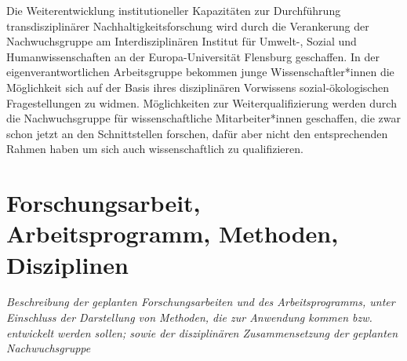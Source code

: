 \documentclass[a4paper,11pt,twoside]{scrartcl}
\begin{document}

Die Weiterentwicklung institutioneller Kapazitäten zur Durchführung transdisziplinärer Nachhaltigkeitsforschung wird durch die Verankerung der Nachwuchsgruppe am Interdisziplinären Institut für Umwelt-, Sozial und Humanwissenschaften an der Europa-Universität Flensburg geschaffen. In der eigenverantwortlichen Arbeitsgruppe bekommen junge Wissenschaftler*innen die Möglichkeit sich auf der Basis ihres disziplinären Vorwissens sozial-ökologischen Fragestellungen zu widmen. Möglichkeiten zur Weiterqualifizierung werden durch die  Nachwuchsgruppe für wissenschaftliche Mitarbeiter*innen geschaffen, die zwar schon jetzt an den Schnittstellen forschen, dafür aber nicht den entsprechenden Rahmen haben um sich auch wissenschaftlich zu qualifizieren.


\section{Forschungsarbeit, Arbeitsprogramm, Methoden, Disziplinen}
\textit{Beschreibung der geplanten Forschungsarbeiten und des Arbeitsprogramms, unter Einschluss der Darstellung von Methoden, die zur Anwendung kommen bzw. entwickelt werden sollen; sowie der disziplinären Zusammensetzung der geplanten Nachwuchsgruppe}

\end{document}
